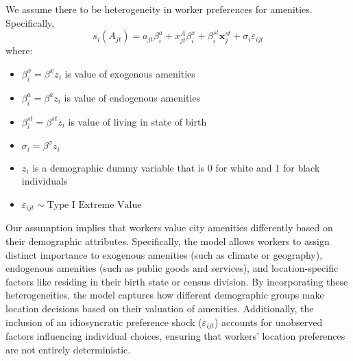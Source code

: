 \documentclass{article}
\begin{document}
We assume there to be heterogeneity in worker preferences for amenities. Specifically,
\begin{equation}\label{eq_worker_amenities}
    s_i(A_{jt}) = a_{jt}\beta_i^a + x_{jt}^A\beta_i^x + \beta_i^{st}\bm{x}_{j}^{st} +  \sigma_i\varepsilon_{ijt}
\end{equation}
where:
\begin{itemize}
    \item $\beta_i^x = \beta^x z_i$ is value of exogenous amenities
    \item $\beta_i^{a} = \beta^{a} z_i$ is value of endogenous amenities
    \item $\beta_i^{st} = \beta^{st} z_i$ is value of living in state of birth
    \item $\sigma_i = \beta^\sigma z_i$
    \item $z_i$ is a demographic dummy variable that is 0 for white and 1 for black individuals
    \item $\varepsilon_{ijt}\sim\text{Type I Extreme Value}$
\end{itemize}
Our assumption implies that workers value city amenities differently based on their demographic attributes. Specifically, the model allows workers to assign distinct importance to exogenous amenities (such as climate or geography), endogenous amenities (such as public goods and services), and location-specific factors like residing in their birth state or census division. By incorporating these heterogeneities, the model captures how different demographic groups make location decisions based on their valuation of amenities. Additionally, the inclusion of an idiosyncratic preference shock ($\varepsilon_{ijt}$) accounts for unobserved factors influencing individual choices, ensuring that workers' location preferences are not entirely deterministic.
\end{document}
